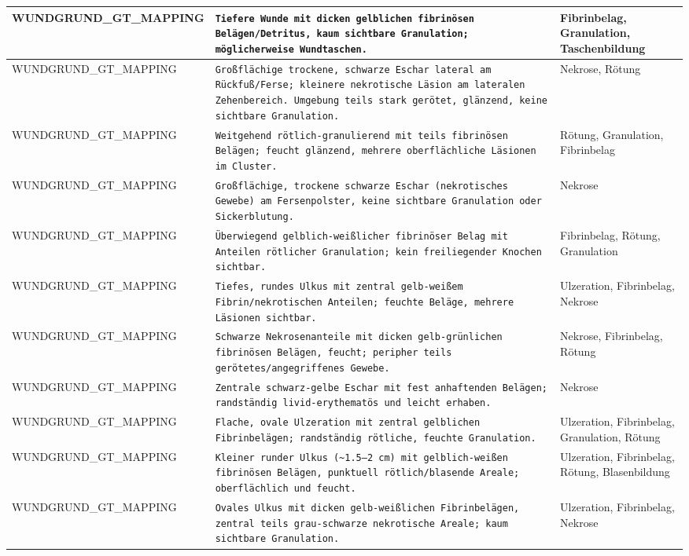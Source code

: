 \begin{longtable}{|p{3.5cm}|p{5cm}|p{6.5cm}|}
WUNDGRUND\_GT\_MAPPING & \texttt{Tiefere Wunde mit dicken gelblichen fibrinösen Belägen/Detritus, kaum sichtbare Granulation; möglicherweise Wundtaschen.} & Fibrinbelag, Granulation, Taschenbildung \\ \hline
WUNDGRUND\_GT\_MAPPING & \texttt{Großflächige trockene, schwarze Eschar lateral am Rückfuß/Ferse; kleinere nekrotische Läsion am lateralen Zehenbereich. Umgebung teils stark gerötet, glänzend, keine sichtbare Granulation.} & Nekrose, Rötung \\ \hline
WUNDGRUND\_GT\_MAPPING & \texttt{Weitgehend rötlich-granulierend mit teils fibrinösen Belägen; feucht glänzend, mehrere oberflächliche Läsionen im Cluster.} & Rötung, Granulation, Fibrinbelag \\ \hline
WUNDGRUND\_GT\_MAPPING & \texttt{Großflächige, trockene schwarze Eschar (nekrotisches Gewebe) am Fersenpolster, keine sichtbare Granulation oder Sickerblutung.} & Nekrose \\ \hline
WUNDGRUND\_GT\_MAPPING & \texttt{Überwiegend gelblich-weißlicher fibrinöser Belag mit Anteilen rötlicher Granulation; kein freiliegender Knochen sichtbar.} & Fibrinbelag, Rötung, Granulation \\ \hline
WUNDGRUND\_GT\_MAPPING & \texttt{Tiefes, rundes Ulkus mit zentral gelb-weißem Fibrin/nekrotischen Anteilen; feuchte Beläge, mehrere Läsionen sichtbar.} & Ulzeration, Fibrinbelag, Nekrose \\ \hline
WUNDGRUND\_GT\_MAPPING & \texttt{Schwarze Nekrosenanteile mit dicken gelb-grünlichen fibrinösen Belägen, feucht; peripher teils gerötetes/angegriffenes Gewebe.} & Nekrose, Fibrinbelag, Rötung \\ \hline
WUNDGRUND\_GT\_MAPPING & \texttt{Zentrale schwarz-gelbe Eschar mit fest anhaftenden Belägen; randständig livid-erythematös und leicht erhaben.} & Nekrose \\ \hline
WUNDGRUND\_GT\_MAPPING & \texttt{Flache, ovale Ulzeration mit zentral gelblichen Fibrinbelägen; randständig rötliche, feuchte Granulation.} & Ulzeration, Fibrinbelag, Granulation, Rötung \\ \hline
WUNDGRUND\_GT\_MAPPING & \texttt{Kleiner runder Ulkus (\textasciitilde{}1.5–2 cm) mit gelblich-weißen fibrinösen Belägen, punktuell rötlich/blasende Areale; oberflächlich und feucht.} & Ulzeration, Fibrinbelag, Rötung, Blasenbildung \\ \hline
WUNDGRUND\_GT\_MAPPING & \texttt{Ovales Ulkus mit dicken gelb-weißlichen Fibrinbelägen, zentral teils grau-schwarze nekrotische Areale; kaum sichtbare Granulation.} & Ulzeration, Fibrinbelag, Nekrose \\ \hline

\end{longtable}
